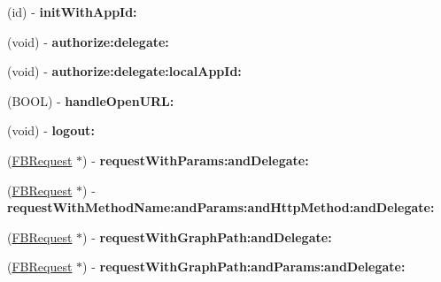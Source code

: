 \begin{DoxyCompactItemize}
\item 
\hypertarget{interface_facebook_aa85460ff62b6bf81946548b7983b931d}{
(id) -\/ {\bfseries init\-With\-App\-Id\-:}}
\label{interface_facebook_aa85460ff62b6bf81946548b7983b931d}

\item 
\hypertarget{interface_facebook_ae8e4829a8dbf6270c1fa9ee66726560c}{
(void) -\/ {\bfseries authorize\-:delegate\-:}}
\label{interface_facebook_ae8e4829a8dbf6270c1fa9ee66726560c}

\item 
\hypertarget{interface_facebook_a6f8b7a7d0999024180dcdee71dba1dfe}{
(void) -\/ {\bfseries authorize\-:delegate\-:local\-App\-Id\-:}}
\label{interface_facebook_a6f8b7a7d0999024180dcdee71dba1dfe}

\item 
\hypertarget{interface_facebook_af59e46399f97cdb3f7f235822a30f06f}{
(\-B\-O\-O\-L) -\/ {\bfseries handle\-Open\-U\-R\-L\-:}}
\label{interface_facebook_af59e46399f97cdb3f7f235822a30f06f}

\item 
\hypertarget{interface_facebook_a204f10894608b3e10943e15d9861c9be}{
(void) -\/ {\bfseries logout\-:}}
\label{interface_facebook_a204f10894608b3e10943e15d9861c9be}

\item 
\hypertarget{interface_facebook_abda41d7c75de5231b460869564a4148c}{
(\hyperlink{interface_f_b_request}{\-F\-B\-Request} $\ast$) -\/ {\bfseries request\-With\-Params\-:and\-Delegate\-:}}
\label{interface_facebook_abda41d7c75de5231b460869564a4148c}

\item 
\hypertarget{interface_facebook_abdd8888ceec0cc9641b3939345cb71bb}{
(\hyperlink{interface_f_b_request}{\-F\-B\-Request} $\ast$) -\/ {\bfseries request\-With\-Method\-Name\-:and\-Params\-:and\-Http\-Method\-:and\-Delegate\-:}}
\label{interface_facebook_abdd8888ceec0cc9641b3939345cb71bb}

\item 
\hypertarget{interface_facebook_ade34a729c134bba23ad8a432346a52b3}{
(\hyperlink{interface_f_b_request}{\-F\-B\-Request} $\ast$) -\/ {\bfseries request\-With\-Graph\-Path\-:and\-Delegate\-:}}
\label{interface_facebook_ade34a729c134bba23ad8a432346a52b3}

\item 
\hypertarget{interface_facebook_a01d3d35b70775982c37d68a53b911438}{
(\hyperlink{interface_f_b_request}{\-F\-B\-Request} $\ast$) -\/ {\bfseries request\-With\-Graph\-Path\-:and\-Params\-:and\-Delegate\-:}}
\label{interface_facebook_a01d3d35b70775982c37d68a53b911438}


\end{DoxyCompactItemize}
